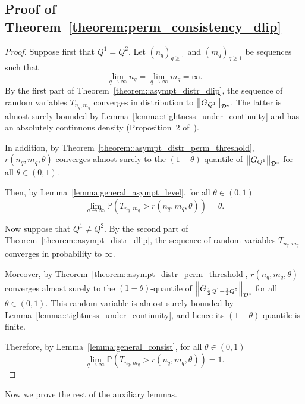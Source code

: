 \subsection*{Proof of Theorem~\ref{theorem:perm_consistency_dlip}}
\begin{proof}
Suppose first that $Q^1 = Q^2$. Let $(n_q)_{q \geq 1}$ and $(m_q)_{q \geq 1}$ be sequences such that
\[
\lim_{q \to \infty} n_q = \lim_{q \to \infty} m_q = \infty.
\]
By the first part of Theorem~\ref{theorem::asympt_distr_dlip}, the sequence of random variables $T_{n_q,m_q}$ converges in distribution to $\left\| G_{Q^1} \right\|_{\mathcal{D}^*}$. The latter is almost surely bounded by Lemma~\ref{lemma::tightness_under_continuity} and has an absolutely continuous density (Proposition~2 of~\cite{beran1986confidence}).

In addition, by Theorem~\ref{theorem::asympt_distr_perm_threshold}, $r(n_q,m_q,\theta)$ converges almost surely to the $(1-\theta)$-quantile of $\left\| G_{Q^1} \right\|_{\mathcal{D}^*}$ for all $\theta \in (0,1)$.

Then, by Lemma~\ref{lemma:general_asympt_level}, for all $\theta \in (0,1)$
\[
\lim_{q \to \infty}\mathbb{P}\!\left(T_{n_q,m_q} > r(n_q,m_q,\theta)\right)
= \theta.
\]

Now suppose that $Q^1 \neq Q^2$. By the second part of Theorem~\ref{theorem::asympt_distr_dlip}, the sequence of random variables $T_{n_q,m_q}$ converges in probability to $\infty$.

Moreover, by Theorem~\ref{theorem::asympt_distr_perm_threshold}, $r(n_q,m_q,\theta)$ converges almost surely to the $(1-\theta)$-quantile of $\left\| G_{\frac{1}{2}Q^1 + \frac{1}{2}Q^2} \right\|_{\mathcal{D}^*}$ for all $\theta \in (0,1)$. This random variable is almost surely bounded by Lemma~\ref{lemma::tightness_under_continuity}, and hence its $(1-\theta)$-quantile is finite.

Therefore, by Lemma~\ref{lemma:general_consist}, for all $\theta \in (0,1)$
\[
\lim_{q \to \infty}
\mathbb{P}\!\left(T_{n_q, m_q} > r(n_q, m_q, \theta)\right)
= 1.
\]
\end{proof}


Now we prove the rest of the auxiliary lemmas.


